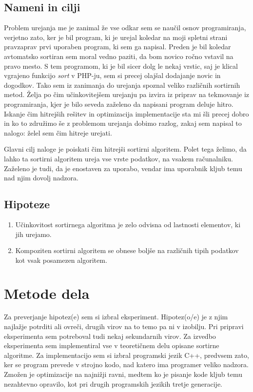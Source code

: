 \documentclass[a4paper,oneside,12pt]{article}
\begin{document}
\subsection{Nameni in cilji}
Problem urejanja me je zanimal že vse odkar sem se naučil osnov programiranja,
verjetno zato, ker je bil program, ki je urejal koledar na moji spletni strani
pravzaprav prvi uporaben program, ki sem ga napisal. Preden je bil koledar 
avtomatsko sortiran sem moral vedno paziti, da bom novico ročno vstavil na pravo
mesto. S tem programom, ki je bil sicer dolg le nekaj vrstic, saj je klical
vgrajeno funkcijo \emph{sort} v PHP-ju, sem si precej olajšal dodajanje novic in dogodkov.  
Tako sem iz zanimanja do urejanja spoznal veliko različnih sortirnih metod.
Želja po čim učinkovitejšem urejanju pa izvira iz 
priprav na tekmovanje iz programiranja, kjer je bilo seveda zaželeno da
napisani program deluje hitro. Iskanje čim hitrejših rešitev in optimizacija 
implementacije sta mi šli precej dobro in ko to združimo še z problemom
urejanja dobimo razlog, zakaj sem napisal to nalogo: želel sem čim hitreje
urejati.

Glavni cilj naloge je poiskati čim hitrejši sortirni algoritem. Polet tega
želimo, da lahko ta sortirni algoritem ureja vse vrste podatkov, na vsakem
računalniku. Zaželeno je tudi, da je enostaven za uporabo, vendar ima uporabnik
kljub temu nad njim dovolj nadzora.

\subsection{Hipoteze}
\begin{enumerate}
  \item \label{hip:dif:type:dif:algo} Učinkovitost sortirnega
    algoritma je zelo odvisna od lastnosti elementov, ki jih urejamo.
  \item \label{hip:komp:vs:nekomp} Kompoziten sortirni algoritem se obnese boljše na različnih tipih podatkov kot vsak
    posamezen algoritem.
\end{enumerate}

\section{Metode dela}
Za preverjanje hipotez(e) sem si izbral eksperiment. Hipotez(o/e) je z njim najlažje
potrditi ali ovreči, drugih virov na to temo pa ni v izobilju. Pri pripravi eksperimenta
sem potreboval tudi nekaj sekundarnih virov. Za izvedbo eksperimenta sem implementiral vse 
v teoretičnem delu opisane sortirne algoritme. Za implementacijo sem si izbral programski 
jezik C++, predvsem zato, ker se program prevede v strojno kodo, nad katero ima programer
veliko nadzora. Zmožen je optimizacije na najnižji ravni, medtem ko je pisanje kode kljub
temu nezahtevno opravilo, kot pri drugih programskih jezikih tretje generacije.
\end{document}

